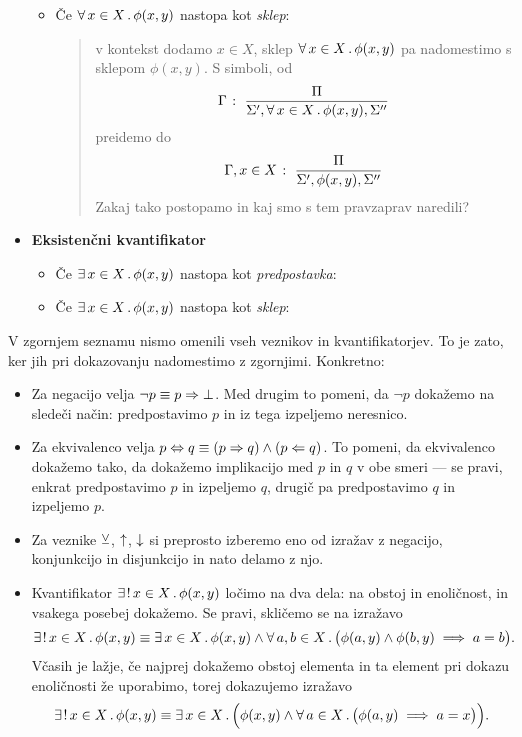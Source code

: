 \begin{itemize}
\begin{itemize}
\begin{quote}
					\end{quote}
				\item
					Če $\xall{x}[X]{\phi(x, y)}$ nastopa kot \emph{sklep}:
					\begin{quote}
						v kontekst dodamo $x \in X$, sklep $\xall{x}[X]{\phi(x, y)}$ pa nadomestimo s sklepom $\phi(x, y)$. S simboli, od
						\[\claim{\Gamma}{\Pi}{\Sigma', \xall{x}[X]{\phi(x, y)}, \Sigma''}\]
						preidemo do
						\[{\Gamma, x \in X} \;\colon\; \frac{\Pi}{\Sigma', \phi(x, y), \Sigma''}\]
						Zakaj tako postopamo in kaj smo s tem pravzaprav naredili? 
					\end{quote}
			\end{itemize}
		\item\textbf{Eksistenčni kvantifikator}
			\begin{itemize}
				\item
					Če $\xsome{x}[X]{\phi(x, y)}$ nastopa kot \emph{predpostavka}:
					\begin{quote}
					\end{quote}
				\item
					Če $\xsome{x}[X]{\phi(x, y)}$ nastopa kot \emph{sklep}:
					\begin{quote}
					\end{quote}
			\end{itemize}
	\end{itemize}
	
	V zgornjem seznamu nismo omenili vseh veznikov in kvantifikatorjev. To je zato, ker jih pri dokazovanju nadomestimo z zgornjimi. Konkretno:
	\begin{itemize}
		\item
			Za negacijo velja $\lnot{p} \equiv p \Rightarrow \bot$. Med drugim to pomeni, da $\lnot{p}$ dokažemo na sledeči način: predpostavimo $p$ in iz tega izpeljemo neresnico. 
		\item
			Za ekvivalenco velja $p \Leftrightarrow q \equiv (p \Rightarrow q) \land (p \Leftarrow q)$. To pomeni, da ekvivalenco dokažemo tako, da dokažemo implikacijo med $p$ in $q$ v obe smeri --- se pravi, enkrat predpostavimo $p$ in izpeljemo $q$, drugič pa predpostavimo $q$ in izpeljemo $p$.
		\item
			Za veznike $\mathbin{\veebar}$, $\mathbin{\uparrow}$, $\mathbin{\downarrow}$ si preprosto izberemo eno od izražav z negacijo, konjunkcijo in disjunkcijo in nato delamo z njo.
		\item
			Kvantifikator $\xexactlyone{x}[X]{\phi(x, y)}$ ločimo na dva dela: na obstoj in enoličnost, in vsakega posebej dokažemo. Se pravi, skličemo se na izražavo
			\[\xexactlyone{x}[X]{\phi(x, y)} \equiv \xsome{x}[X]{\phi(x, y)} \land \all[1]{a, b}[X]{\phi(a, y) \land \phi(b, y) \implies a = b}.\]
			Včasih je lažje, če najprej dokažemo obstoj elementa in ta element pri dokazu enoličnosti že uporabimo, torej dokazujemo izražavo
			\[\xexactlyone{x}[X]{\phi(x, y)} \equiv \some[2]{x}[X]{\phi(x, y) \land \all[1]{a}[X]{\phi(a, y) \implies a = x}}.\]
	\end{itemize}